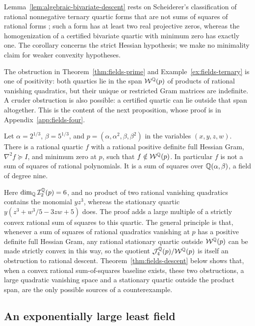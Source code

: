 Lemma~\ref{lem:algebraic-bivariate-descent} rests on Scheiderer's
classification of rational nonnegative ternary quartic forms that are not
sums of squares of rational forms \cite[Theorem~4.1]{Scheiderer2016}; such a
form has at least two real projective zeros, whereas the homogenization of a
certified bivariate quartic with minimum zero has exactly one. The corollary
concerns the strict Hessian hypothesis; we make no minimality claim for
weaker convexity hypotheses.

The obstruction in Theorem~\ref{thm:fields-prime} and
Example~\ref{ex:fields-ternary} is one of positivity: both quartics lie in
the span $\mathcal W^\mathbb Q(p)$ of products of rational vanishing quadratics,
but their unique or restricted Gram matrices are indefinite. A cruder
obstruction is also possible: a certified quartic can lie outside that span
altogether. This is the content of the next proposition, whose proof is in
Appendix~\ref{app:fields-four}.

\begin{proposition}
\label{prop:fields-four}
Let $\alpha=2^{1/3}$, $\beta=5^{1/3}$, and $p=(\alpha,\alpha^2,\beta,\beta^2)$
in the variables $(x,y,z,w)$. There is a rational quartic $f$ with a rational
positive definite full Hessian Gram, $\nabla^2f\succeq I$, and minimum zero at
$p$, such that $f\notin\mathcal W^\mathbb Q(p)$. In particular $f$ is not a sum of
squares of rational polynomials. It is a sum of squares over
$\mathbb Q(\alpha,\beta)$, a field of degree nine.
\end{proposition}

Here $\dim_\mathbb Q\mathcal I_2^\mathbb Q(p)=6$, and no product of two rational vanishing
quadratics contains the monomial $yz^3$, whereas the stationary quartic
$y(z^3+w^3/5-3zw+5)$ does. The proof adds a large multiple of a strictly
convex rational sum of squares to this quartic. The general principle is
that, whenever a sum of squares of rational quadratics vanishing at $p$ has a
positive definite full Hessian Gram, any rational stationary quartic outside
$\mathcal W^\mathbb Q(p)$ can be made strictly convex in this way, so the quotient
$\mathcal J_4^\mathbb Q(p)/\mathcal W^\mathbb Q(p)$ is itself an obstruction to rational
descent. Theorem~\ref{thm:fields-descent} below shows that, when a convex
rational sum-of-squares baseline exists, these two obstructions, a large
quadratic vanishing space and a stationary quartic outside the product span,
are the only possible sources of a counterexample.

\subsection{An exponentially large least field}
\label{sec:fields-tower}

